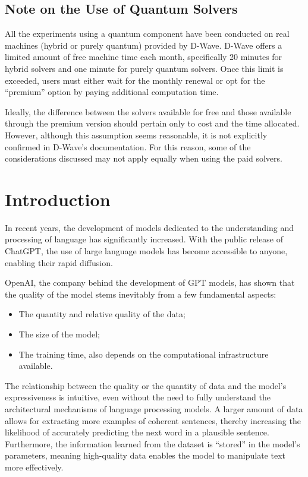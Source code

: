 \section*{Note on the Use of Quantum Solvers}

All the experiments using a quantum component have been conducted on real machines (hybrid or purely quantum) provided by D-Wave.
D-Wave offers a limited amount of free machine time each month, specifically 20 minutes for hybrid solvers and one minute for purely quantum solvers.
Once this limit is exceeded, users must either wait for the monthly renewal or opt for the ``premium'' option by paying additional computation time.

Ideally, the difference between the solvers available for free and those available through the premium version should pertain only to cost and the time allocated.
However, although this assumption seems reasonable, it is not explicitly confirmed in D-Wave's documentation.
For this reason, some of the considerations discussed may not apply equally when using the paid solvers.

\chapter{Introduction}

In recent years, the development of models dedicated to the understanding and processing of language has significantly increased. 
With the public release of ChatGPT\cite{chatgpt}, the use of large language models has become accessible to anyone, enabling their rapid diffusion.

OpenAI, the company behind the development of GPT models, has shown\cite{scaling} that the quality of the model stems inevitably from a few fundamental aspects:
\begin{itemize}
    \item The quantity and relative quality of the data;
    \item The size of the model;
    \item The training time, also depends on the computational infrastructure available.
\end{itemize}

The relationship between the quality or the quantity of data and the model's expressiveness is intuitive, even without the need to fully understand the architectural mechanisms of language processing models. 
A larger amount of data allows for extracting more examples of coherent sentences, thereby increasing the likelihood of accurately predicting the next word in a plausible sentence.
Furthermore, the information learned from the dataset is ``stored'' in the model's parameters, meaning high-quality data enables the model to manipulate text more effectively.

